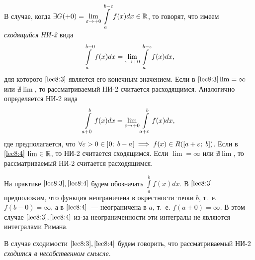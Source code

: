 \documentclass[../../main.tex]{subfiles}
\begin{document}
В случае, когда $\exists G(+0) = \underset{\varepsilon \to +0}\lim 
\displaystyle\int\limits_{a}^{b - \varepsilon}f(x)dx \in \mathbb{R}$, то говорят, что имеем 
\emph{сходящийся НИ-2} вида
\begin{equation}\label{lec8:3}
\displaystyle\int\limits_{a}^{b - 0}f(x)dx = \underset{\varepsilon \to +0}\lim 
\displaystyle\int\limits_{a}^{b - \varepsilon}f(x)dx,
\end{equation}
для которого $\eqref{lec8:3}$ является его конечным значением. Если в 
$\eqref{lec8:3} \lim = \infty$ или $\nexists \lim$, то рассматриваемый НИ-2 
считается расходящимся. Аналогично определяется НИ-2 вида
\begin{equation} \label{lec8:4}
 \int\limits_{a + 0}^{b}f(x)dx = \underset{\varepsilon \to +0}\lim \int\limits_{a + 
 \varepsilon}^{b}f(x)dx,
\end{equation}
где предполагается, что $\forall \varepsilon > 0 \in \left]0;\; b - a\right[ \implies 
f(x) \in R(\left[a + \varepsilon;\; b\right])$. Если в \eqref{lec8:4} ${\lim \in 
\mathbb{R}}$, 
то НИ-2 считается сходящимся. Если $\lim = \infty$ или $\nexists \lim$, то 
рассматриваемый НИ-2 считается расходящимся.

На практике $\eqref{lec8:3}, \eqref{lec8:4}$ будем обозначать 
$\displaystyle\int\limits_{a}^{b}f(x)dx$. В $\eqref{lec8:3}$ предположим, что 
функция неограничена в окрестности точки $b$, т.~е. $f(b - 0) = \infty$, а в 
$\eqref{lec8:4}$~--- неограничена в $a$, т.~е. $f(a + 0) = \infty$. В этом 
случае 
$\eqref{lec8:3}, \eqref{lec8:4}$ из-за неограниченности эти интегралы не 
являются интегралами 
Римана.

В случае сходимости $\eqref{lec8:3}, \eqref{lec8:4}$ будем говорить, что 
рассматриваемый НИ-2 \emph{сходится в несобственном смысле}.
\end{document}
